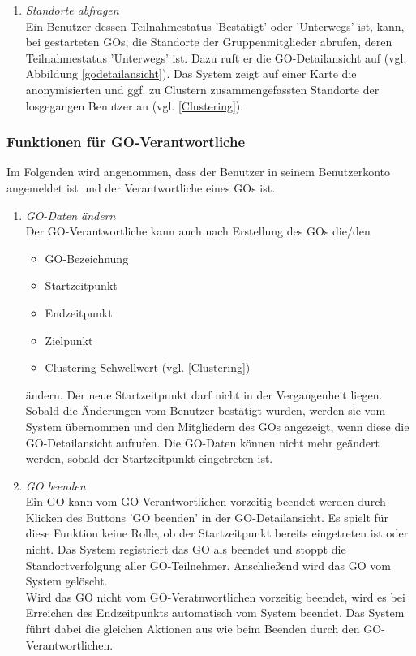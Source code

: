 \documentclass[parskip=full]{scrartcl}
\def\threedigits#1{%
  \ifnum#1<100 0\fi
  \ifnum#1<10 0\fi
  \number#1}
\begin{document}
\begin{enumerate}[label={\textbf{/F\protect\threedigits{\theenumi}0/}}, leftmargin=*, resume]
	
	\item \textit{Standorte abfragen}\label{Standorte abrufen} \\
	Ein Benutzer dessen Teilnahmestatus 'Bestätigt' oder 'Unterwegs' ist, kann, bei gestarteten GOs, die Standorte der Gruppenmitglieder abrufen, deren Teilnahmestatus 'Unterwegs' ist. Dazu ruft er die GO-Detailansicht auf (vgl. Abbildung \ref{godetailansicht}). Das System zeigt auf einer Karte die anonymisierten und ggf. zu Clustern zusammengefassten Standorte der losgegangen Benutzer an (vgl. \ref{Clustering}).
	
\end{enumerate}

\subsubsection{Funktionen für GO-Verantwortliche}
Im Folgenden wird angenommen, dass der Benutzer in seinem Benutzerkonto angemeldet ist und der Verantwortliche eines GOs ist.

\begin{enumerate}[label={\textbf{/F\protect\threedigits{\theenumi}0/}}, leftmargin=*, resume]	
	\item \textit{GO-Daten ändern}\label{GO Daten ändern} \\
	Der GO-Verantwortliche kann auch nach Erstellung des GOs die/den
	\begin{itemize}
		\item GO-Bezeichnung
		\item Startzeitpunkt
		\item Endzeitpunkt
		\item Zielpunkt
		\item \colorbox{shadecolor}{Clustering-Schwellwert (vgl. \ref{Clustering})}
	\end{itemize}
	ändern. Der neue Startzeitpunkt darf nicht in der Vergangenheit liegen. Sobald die Änderungen vom Benutzer bestätigt wurden, werden sie vom System übernommen und den Mitgliedern des GOs angezeigt, wenn diese die GO-Detailansicht aufrufen. Die GO-Daten können nicht mehr geändert werden, sobald der Startzeitpunkt eingetreten ist.
	
	\item \textit{GO beenden}\label{GO beenden} \\
	Ein GO kann vom GO-Verantwortlichen vorzeitig beendet werden durch Klicken des Buttons 'GO beenden' in der GO-Detailansicht. Es spielt für diese Funktion keine Rolle, ob der Startzeitpunkt bereits eingetreten ist oder nicht. Das System registriert das GO als beendet und stoppt die Standortverfolgung aller GO-Teilnehmer. Anschließend wird das GO vom System gelöscht. \\
	Wird das GO nicht vom GO-Veratnwortlichen vorzeitig beendet, wird es bei Erreichen des Endzeitpunkts automatisch vom System beendet. Das System führt dabei die gleichen Aktionen aus wie beim Beenden durch den GO-Verantwortlichen.
	
\end{enumerate}
\end{document}
